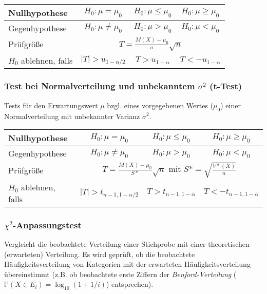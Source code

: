 \begin{tabular}{|l|c|c|c|}
    \hline
    Nullhypothese  & $H_0 : \mu = \mu_0$    & $H_0 : \mu \leq \mu_0$ & $H_0 : \mu \geq \mu_0$ \\ 
    \hline
    Gegenhypothese & $H_0 : \mu \neq \mu_0$ & $H_0 : \mu > \mu_0$    & $H_0 : \mu < \mu_0$ \\ 
    \hline
    Prüfgröße      & \multicolumn{3}{|c|}{$T=\frac{M(X)-\mu_0}{\sigma}\sqrt{n}$}\\
    \hline
    $H_0$ ablehnen, falls & $|T| > u_{1-\alpha/2}$ & $T > u_{1-\alpha}$ & $T < -u_{1-\alpha}$\\
    \hline
\end{tabular}


\subsubsection{Test bei Normalverteilung und unbekanntem \(\sigma^2\) (t-Test)}

Tests für den Erwartungswert \(\mu\) bzgl. eines vorgegebenen Wertes (\(\mu_0\)) einer Normalverteilung mit unbekannter Varianz \(\sigma^2\).\\

\begin{tabular}{|l|c|c|c|}
    \hline
    Nullhypothese  & $H_0 : \mu = \mu_0$    & $H_0 : \mu \leq \mu_0$ & $H_0 : \mu \geq \mu_0$ \\ 
    \hline
    Gegenhypothese & $H_0 : \mu \neq \mu_0$ & $H_0 : \mu > \mu_0$    & $H_0 : \mu < \mu_0$ \\ 
    \hline
    Prüfgröße      & \multicolumn{3}{|c|}{$T=\frac{M(X)-\mu_0}{S*}\sqrt{n}$ mit $S*=\sqrt{\frac{V*(X)}{n}}$}\\
    \hline
    $H_0$ ablehnen, falls & $|T| > t_{n-1, 1-\alpha/2}$ & $T > t_{n-1, 1-\alpha}$ & $T < -t_{n-1, 1-\alpha}$\\
    \hline
\end{tabular}




\subsubsection{\(\chi^2\)-Anpassungstest}

Vergleicht die beobachtete Verteilung einer Stichprobe mit 
einer theoretischen (erwarteten) Verteilung. Es wird geprüft, 
ob die beobachtete Häufigkeitsverteilung von Kategorien mit der 
erwarteten Häufigkeitsverteilung übereinstimmt (z.B. ob beobachtete erste Ziffern der \emph{Benford-Verteilung} (\(\mathbb{P}(X\in E_i) = \log_{10}(1+1/i)\)) entsprechen).\\

